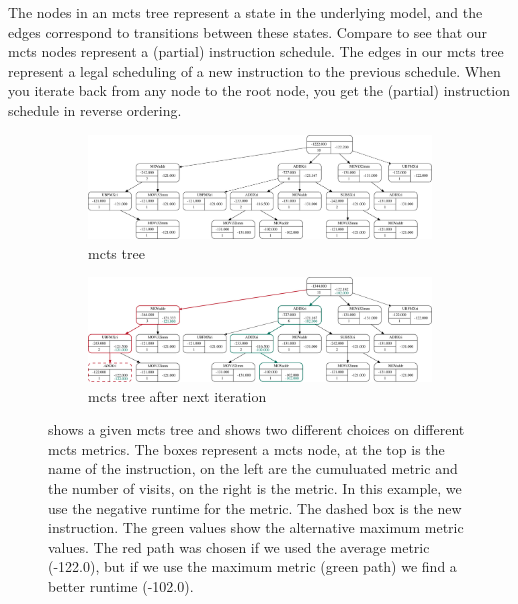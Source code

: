 The nodes in an \ac{mcts} tree represent a state in the underlying model, and the edges correspond to transitions between these states.
Compare  to see that our \ac{mcts} nodes represent a (partial) instruction schedule.
The edges in our \ac{mcts} tree represent a legal scheduling of a new instruction to the previous schedule.
When you iterate back from any node to the root node, you get the (partial) instruction schedule in reverse ordering.
\begin{figure}[p]
    \centering
    \begin{subfigure}[b]{0.3\textwidth}
        \centering
        \includegraphics[width=17.5cm,angle=90]{data/mcts-max-vs-avg/svg/selected/8752639012199.pdf}
        \caption{\ac{mcts} tree}
        \label{fig:approach:max-vs-avg:a}
    \end{subfigure}
    \hspace{0.2\textwidth}
    \begin{subfigure}[b]{0.3\textwidth}
        \centering
        \includegraphics[width=17.5cm,angle=90]{data/mcts-max-vs-avg/svg/selected/8752639012199-next.pdf}
        \caption{\ac{mcts} tree after next iteration}
        \label{fig:approach:max-vs-avg:b}
    \end{subfigure}
    \caption[\ac{mcts} tree with the consequences of maximum and average metric]{
         shows a given \ac{mcts} tree and  shows two different choices on different \ac{mcts} metrics.
        The boxes represent a \ac{mcts} node, at the top is the name of the instruction, on the left are the cumuluated metric and the number of visits, on the right is the metric.
        In this example, we use the negative runtime for the metric.
        The dashed box is the new instruction.
        The green values show the alternative maximum metric values.
        The red path was chosen if we used the average metric (-122.0), but if we use the maximum metric (green path) we find a better runtime (-102.0).
    }
    \label{fig:approach:max-vs-avg}
\end{figure}

